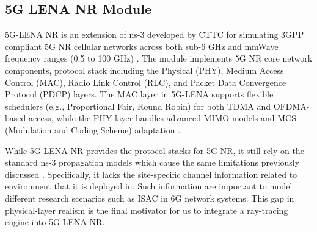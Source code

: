 \subsection{5G LENA NR Module}
5G-LENA NR is an extension of ns-3 developed by CTTC for simulating 3GPP compliant 5G NR cellular networks across both sub-6 GHz and mmWave frequency ranges (0.5 to 100 GHz) \cite{5glena}.
The module implements  5G NR core network components, protocol stack including the Physical (PHY), Medium Access Control (MAC), Radio Link Control (RLC), and Packet Data Convergence Protocol (PDCP) layers.
The MAC layer in 5G-LENA supports flexible schedulers (e.g., Proportional Fair, Round Robin) for both TDMA and OFDMA-based access, while the PHY layer handles advanced MIMO models and MCS (Modulation and Coding Scheme) adaptation \cite{5glena,bojovic_mimo,bojovic_beamforming}.

While 5G-LENA NR provides the protocol stacks for 5G NR, it still rely on the standard ns-3 propagation models which cause the same limitations previously discussed \cite{5glena,tr38901}.
Specifically, it lacks the site-specific channel information related to environment that it is deployed in.
Such information are important to model different research scenarios such as ISAC in 6G network systems.
This gap in physical-layer realism is the final motivator for us to integrate a ray-tracing engine into 5G-LENA NR.
